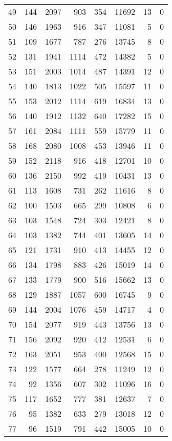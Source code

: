 \documentclass[letterpaper]{article}
\begin{document}
\begin{Schunk}
\begin{longtable}{rrrrrrrr}
  49 & 144 & 2097 & 903 & 354 & 11692 & 13 & 0 \\ 
  50 & 146 & 1963 & 916 & 347 & 11081 & 5 & 0 \\ 
  51 & 109 & 1677 & 787 & 276 & 13745 & 8 & 0 \\ 
  52 & 131 & 1941 & 1114 & 472 & 14382 & 5 & 0 \\ 
  53 & 151 & 2003 & 1014 & 487 & 14391 & 12 & 0 \\ 
  54 & 140 & 1813 & 1022 & 505 & 15597 & 11 & 0 \\ 
  55 & 153 & 2012 & 1114 & 619 & 16834 & 13 & 0 \\ 
  56 & 140 & 1912 & 1132 & 640 & 17282 & 15 & 0 \\ 
  57 & 161 & 2084 & 1111 & 559 & 15779 & 11 & 0 \\ 
  58 & 168 & 2080 & 1008 & 453 & 13946 & 11 & 0 \\ 
  59 & 152 & 2118 & 916 & 418 & 12701 & 10 & 0 \\ 
  60 & 136 & 2150 & 992 & 419 & 10431 & 13 & 0 \\ 
  61 & 113 & 1608 & 731 & 262 & 11616 & 8 & 0 \\ 
  62 & 100 & 1503 & 665 & 299 & 10808 & 6 & 0 \\ 
  63 & 103 & 1548 & 724 & 303 & 12421 & 8 & 0 \\ 
  64 & 103 & 1382 & 744 & 401 & 13605 & 14 & 0 \\ 
  65 & 121 & 1731 & 910 & 413 & 14455 & 12 & 0 \\ 
  66 & 134 & 1798 & 883 & 426 & 15019 & 14 & 0 \\ 
  67 & 133 & 1779 & 900 & 516 & 15662 & 13 & 0 \\ 
  68 & 129 & 1887 & 1057 & 600 & 16745 & 9 & 0 \\ 
  69 & 144 & 2004 & 1076 & 459 & 14717 & 4 & 0 \\ 
  70 & 154 & 2077 & 919 & 443 & 13756 & 13 & 0 \\ 
  71 & 156 & 2092 & 920 & 412 & 12531 & 6 & 0 \\ 
  72 & 163 & 2051 & 953 & 400 & 12568 & 15 & 0 \\ 
  73 & 122 & 1577 & 664 & 278 & 11249 & 12 & 0 \\ 
  74 & 92 & 1356 & 607 & 302 & 11096 & 16 & 0 \\ 
  75 & 117 & 1652 & 777 & 381 & 12637 & 7 & 0 \\ 
  76 & 95 & 1382 & 633 & 279 & 13018 & 12 & 0 \\ 
  77 & 96 & 1519 & 791 & 442 & 15005 & 10 & 0 \\ 

\end{longtable}
\end{Schunk}
\end{document}
